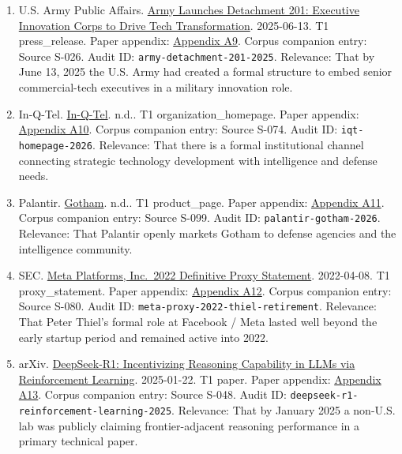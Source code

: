 \documentclass[
  american,
  11pt,
  letterpaper,
]{article}
\begin{document}
\begin{enumerate}
{  A8}. Corpus companion entry: Source S-098. Audit ID:
  \texttt{palantir-anthropic-aws-gov-partnership-2024}. Relevance: That
  by November 7, 2024 Anthropic model access for U.S. intelligence and
  defense agencies was being publicly distributed through a
  Palantir-plus-AWS stack.
\item
  U.S. Army Public Affairs.
  \href{https://www.army.mil/article/286317/army_launches_detachment_201_executive_innovation_corps_to_drive_tech_transformation}{Army
  Launches Detachment 201: Executive Innovation Corps to Drive Tech
  Transformation}. 2025-06-13. T1 press\_release. Paper appendix:
  \hyperref[appendix-a9-army-launches-detachment-201-executive-innovation-corps-to-drive-tech-transformation]{Appendix
  A9}. Corpus companion entry: Source S-026. Audit ID:
  \texttt{army-detachment-201-2025}. Relevance: That by June 13, 2025
  the U.S. Army had created a formal structure to embed senior
  commercial-tech executives in a military innovation role.
\item
  In-Q-Tel. \href{https://www.iqt.org/}{In-Q-Tel}. n.d.. T1
  organization\_homepage. Paper appendix:
  \hyperref[appendix-a10-in-q-tel]{Appendix A10}. Corpus companion
  entry: Source S-074. Audit ID: \texttt{iqt-homepage-2026}. Relevance:
  That there is a formal institutional channel connecting strategic
  technology development with intelligence and defense needs.
\item
  Palantir. \href{https://www.palantir.com/platforms/gotham/}{Gotham}.
  n.d.. T1 product\_page. Paper appendix:
  \hyperref[appendix-a11-gotham]{Appendix A11}. Corpus companion entry:
  Source S-099. Audit ID: \texttt{palantir-gotham-2026}. Relevance: That
  Palantir openly markets Gotham to defense agencies and the
  intelligence community.
\item
  SEC.
  \href{https://www.sec.gov/Archives/edgar/data/1326801/000132680122000043/meta2022definitiveproxysta.htm}{Meta
  Platforms, Inc.~2022 Definitive Proxy Statement}. 2022-04-08. T1
  proxy\_statement. Paper appendix:
  \hyperref[appendix-a12-meta-platforms-inc-2022-definitive-proxy-statement]{Appendix
  A12}. Corpus companion entry: Source S-080. Audit ID:
  \texttt{meta-proxy-2022-thiel-retirement}. Relevance: That Peter
  Thiel's formal role at Facebook / Meta lasted well beyond the early
  startup period and remained active into 2022.
\item
  arXiv. \href{https://arxiv.org/abs/2501.12948}{DeepSeek-R1:
  Incentivizing Reasoning Capability in LLMs via Reinforcement
  Learning}. 2025-01-22. T1 paper. Paper appendix:
  \hyperref[appendix-a13-deepseek-r1-incentivizing-reasoning-capability-in-llms-via-reinforcement-learning]{Appendix
  A13}. Corpus companion entry: Source S-048. Audit ID:
  \texttt{deepseek-r1-reinforcement-learning-2025}. Relevance: That by
  January 2025 a non-U.S. lab was publicly claiming frontier-adjacent
  reasoning performance in a primary technical paper.
\end{enumerate}
\end{document}
